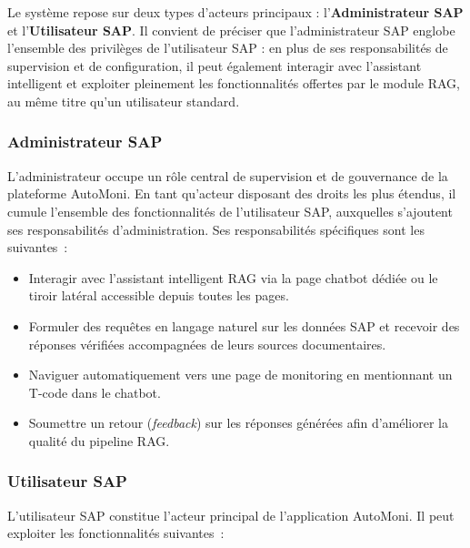 Le système repose sur deux types d'acteurs principaux : l'\textbf{Administrateur SAP}
et l'\textbf{Utilisateur SAP}. Il convient de préciser que l'administrateur SAP englobe
l'ensemble des privilèges de l'utilisateur SAP : en plus de ses responsabilités de
supervision et de configuration, il peut également interagir avec l'assistant intelligent
et exploiter pleinement les fonctionnalités offertes par le module RAG, au même titre
qu'un utilisateur standard.

\subsubsection*{Administrateur SAP}

L'administrateur occupe un rôle central de supervision et de gouvernance de la plateforme AutoMoni.
En tant qu'acteur disposant des droits les plus étendus, il cumule l'ensemble des fonctionnalités
de l'utilisateur SAP, auxquelles s'ajoutent ses responsabilités d'administration.
Ses responsabilités spécifiques sont les suivantes~:

\begin{itemize}
  \item Interagir avec l'assistant intelligent RAG via la page chatbot dédiée ou le tiroir
        latéral accessible depuis toutes les pages.
  \item Formuler des requêtes en langage naturel sur les données SAP et recevoir des réponses
        vérifiées accompagnées de leurs sources documentaires.
  \item Naviguer automatiquement vers une page de monitoring en mentionnant un T-code dans le chatbot.
  \item Soumettre un retour (\textit{feedback}) sur les réponses générées afin d'améliorer
        la qualité du pipeline RAG.
\end{itemize}

\subsubsection*{Utilisateur SAP}

L'utilisateur SAP constitue l'acteur principal de l'application AutoMoni.
Il peut exploiter les fonctionnalités suivantes~:


